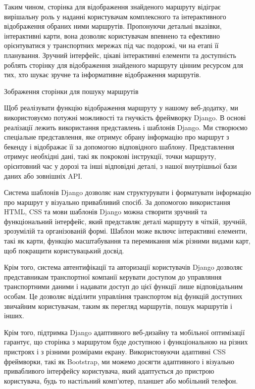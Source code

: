 Таким чином, сторінка для відображення знайденого маршруту відіграє вирішальну роль у наданні користувачам комплексного та інтерактивного відображення обраних ними маршрутів. Пропонуючи детальні вказівки, інтерактивні карти, вона дозволяє користувачам впевнено та ефективно орієнтуватися у транспортних мережах під час подорожі, чи на етапі її планування. Зручний інтерфейс, цікаві інтерактивні елементи та доступність роблять сторінку для відображення знайденого маршруту цінним ресурсом для тих, хто шукає зручне та інформативне відображення маршрутів.


Зображення сторінки для пошуку маршрутів


Щоб реалізувати функцію відображення маршруту у нашому веб-додатку, ми використовуємо потужні можливості та гнучкість фреймворку Django. В основі реалізації лежить використання представлень і шаблонів Django. Ми створюємо спеціальне представлення, яке отримує обрану інформацію про маршрут з бекенду і відображає її за допомогою відповідного шаблону. Представлення отримує необхідні дані, такі як покрокові інструкції, точки маршруту, орієнтовний час у дорозі та інші відповідні деталі, з нашої внутрішньої бази даних або зовнішніх API.

Система шаблонів Django дозволяє нам структурувати і форматувати інформацію про маршрут у візуально привабливий спосіб. За допомогою використання HTML, CSS та мови шаблонів Django можна створити зручний та функціональний інтерфейс, який представляє деталі маршруту в чіткій, зручній, зрозумілій та організованій формі. Шаблон може включє інтерактивні елементи, такі як карти, функцію масштабування та перемикання між різними видами карт, щоб покращити користувацький досвід.

Крім того, система автентифікації та авторизації користувачів Django дозволяє представникам транспортної компанії керувати доступом до управляння транспортними даними і надавати доступ до цієї функції лише відповідальним особам. Це дозволяє відділити управління транспортом від функцій доступних звичайним користувачам, таким як перегляд маршрутів, пошук маршрутів і інших.

Крім того, підтримка Django адаптивного веб-дизайну та мобільної оптимізації гарантує, що сторінка з маршрутом буде доступною і функціональною на різних пристроях і з різними розмірами екрану. Використовуючи адаптивні CSS фреймворки, такі як Bootstrap, ми можемо досягти адаптивного і візуально привабливого інтерфейсу користувача, який адаптується до пристрою користувача, будь то настільний комп'ютер, планшет або мобільний телефон.